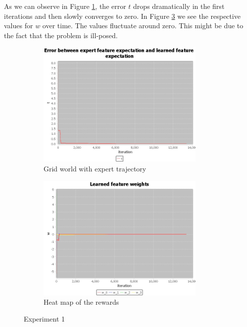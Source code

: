 \documentclass[10pt,a4paper,twocolumn]{article}
\begin{document}
As we can observe in Figure \ref{fig:experiment1t}, the error $t$ drops dramatically in the first iterations and then slowly converges to zero. In Figure \ref{fig:experiment1w} we see the respective values for $w$ over time. The values fluctuate around zero. This might be due to the fact that the problem is ill-posed.

\begin{figure}
\begin{subfigure}[b]{0.5\textwidth}
	\includegraphics[width=\textwidth]{experiment_1_t}
	\caption{Grid world with expert trajectory}
	\label{fig:experiment1t}
\end{subfigure}
\begin{subfigure}[b]{0.5\textwidth}
	\includegraphics[width=\textwidth]{experiment_1_w}
	\caption{Heat map of the rewards}
	\label{fig:experiment1w}
\end{subfigure}
\caption{Experiment 1}
\end{figure}
\end{document}

